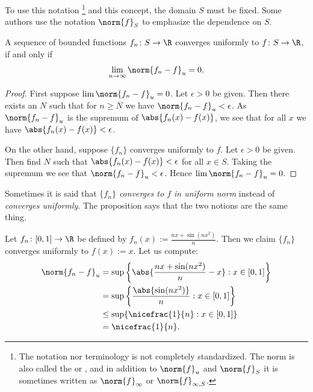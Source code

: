 \documentclass[12pt]{book}
\begin{document}
To use this notation%
\footnote{The notation nor terminology is not completely standardized.
The norm is
also called the
\emph{} or
\emph{}, and in addition
to $\norm{f}_u$ and $\norm{f}_S$ it is sometimes written
as $\norm{f}_{\infty}$ or $\norm{f}_{\infty,S}$.}
and this concept, the domain $S$ must be fixed.
Some authors
use
the notation
$\norm{f}_S$ to emphasize the dependence on $S$.

\begin{prop}
A sequence of bounded functions $f_n \colon S \to \R$ converges
uniformly to $f \colon S \to \R$, if and only if
\begin{equation*}
\lim_{n\to\infty} \norm{f_n - f}_u = 0 .
\end{equation*}
\end{prop}

\begin{proof}
First suppose 
$\lim \norm{f_n - f}_u = 0$.
Let $\epsilon > 0$ be
given.
Then there exists an $N$ such that
for $n \geq N$ we have $\norm{f_n - f}_u < \epsilon$.
As $\norm{f_n-f}_u$
is the supremum of $\abs{f_n(x)-f(x)}$, we see that for all $x$
we have $\abs{f_n(x)-f(x)} < \epsilon$.

On the other hand, suppose $\{ f_n \}$ converges uniformly to $f$.
Let $\epsilon > 0$ be given.
Then find $N$ such that 
$\abs{f_n(x)-f(x)} < \epsilon$ for all $x \in S$.
Taking the supremum we see that
$\norm{f_n - f}_u < \epsilon$.
Hence $\lim \norm{f_n-f}_u = 0$.
\end{proof}

Sometimes it is said that \emph{$\{ f_n \}$ converges to $f$ in uniform norm}
instead of \emph{converges uniformly}.
The proposition
says that the two notions are the same thing.

\begin{example}
Let $f_n \colon [0,1] \to \R$ be defined by $f_n(x) := \frac{nx+ \sin(nx^2)}{n}$.
Then we claim $\{ f_n \}$ converges uniformly to $f(x) := x$.
Let us compute:
\begin{equation*}
\begin{split}
\norm{f_n-f}_u
& =
\sup \left\{ \abs{\frac{nx+ \sin(nx^2)}{n} - x} : x \in [0,1] \right\}
\\
& =
\sup \left\{ \frac{\abs{\sin(nx^2)}}{n} : x \in [0,1] \right\}
\\
& \leq
\sup \{ \nicefrac{1}{n} : x \in [0,1] \}
\\
& = \nicefrac{1}{n}.
\end{split}
\end{equation*}
\end{example}
\end{document}
